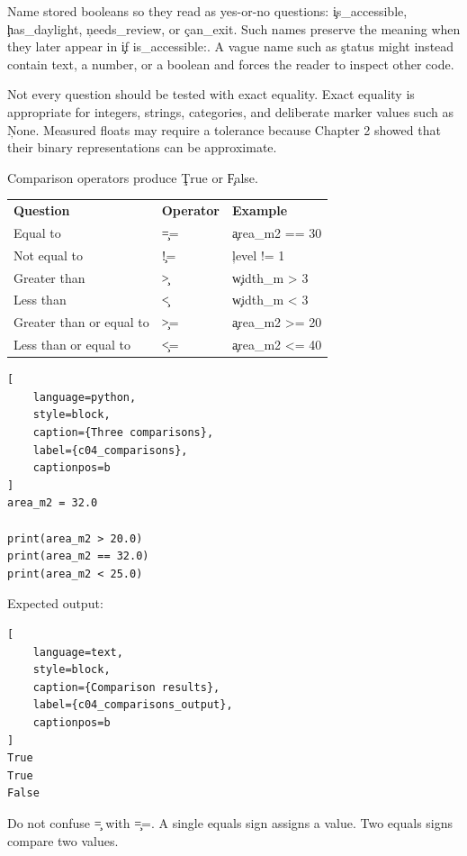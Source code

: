 Name stored booleans so they read as yes-or-no questions: \c{is_accessible},
\c{has_daylight}, \c{needs_review}, or \c{can_exit}. Such names preserve the
meaning when they later appear in \c{if is_accessible:}. A vague name such as
\c{status} might instead contain text, a number, or a boolean and forces the
reader to inspect other code.

Not every question should be tested with exact equality. Exact equality is
appropriate for integers, strings, categories, and deliberate marker values
such as \c{None}.
Measured floats may require a tolerance because Chapter 2 showed that their
binary representations can be approximate.


Comparison operators produce \c{True} or \c{False}.

\begin{center}
\begin{tabular}{lll}
\textbf{Question} & \textbf{Operator} & \textbf{Example} \\
Equal to & \c{==} & \c{area_m2 == 30} \\
Not equal to & \c{!=} & \c{level != 1} \\
Greater than & \c{>} & \c{width_m > 3} \\
Less than & \c{<} & \c{width_m < 3} \\
Greater than or equal to & \c{>=} & \c{area_m2 >= 20} \\
Less than or equal to & \c{<=} & \c{area_m2 <= 40} \\
\end{tabular}
\end{center}

\begin{lstlisting}[
    language=python,
    style=block,
    caption={Three comparisons},
    label={c04_comparisons},
    captionpos=b
]
area_m2 = 32.0

print(area_m2 > 20.0)
print(area_m2 == 32.0)
print(area_m2 < 25.0)
\end{lstlisting}

Expected output:

\begin{lstlisting}[
    language=text,
    style=block,
    caption={Comparison results},
    label={c04_comparisons_output},
    captionpos=b
]
True
True
False
\end{lstlisting}

Do not confuse \c{=} with \c{==}. A single equals sign assigns a value. Two
equals signs compare two values.

